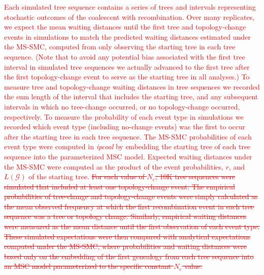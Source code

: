 \documentclass[11pt]{article}
\begin{document}
\textcolor{red}{
Each simulated tree sequence
contains a series of trees and intervals representing stochastic outcomes of
the coalescent with recombination. Over many replicates, we expect the mean
waiting distances until the first tree and topology-change events in simulations 
to match the predicted waiting distances estimated under the MS-SMC, computed
from only observing the starting tree in each tree sequence.
(Note that to avoid any potential bias associated with the first tree interval 
in simulated tree sequences we actually advanced to the first tree after the 
first topology-change event to serve as the starting tree in all analyses.) 
To measure tree and topology-change waiting distances in tree sequences we 
recorded the sum length of the interval that includes the starting tree, and any 
subsequent intervals in which no tree-change occurred, or no topology-change 
occurred, respectively. To measure the probability of each event type in simulations
we recorded which event type (including no-change events) was the first to occur 
after the starting tree in each tree sequence. 
The MS-SMC probabilities of each event type were computed in \emph{ipcoal} by 
embedding the starting tree of each tree sequence into the parameterized MSC model.
Expected waiting distances under the MS-SMC were computed as the product of 
the event probabilities, $r$, and $L(\mathcal{G})$ of the starting tree.
}
\textcolor{red}{\sout{For each value of $N_e$, 10K tree sequences were simulated that
included at least one topology-change event.
The empirical probabilities of tree-change and topology-change events were simply 
calculated as the mean observed frequency at which the first recombination event 
in each tree sequence was a tree or topology change. 
Similarly, empirical waiting 
distances were measured as the mean distance until the first observation of 
each event type. These simulated expectations were then compared with analytical
expectations computed under the MS-SMC, where probabilities and waiting distances 
were based only on the embedding of the first genealogy from each tree sequence 
into an MSC model parameterized to the specific constant $N_e$ value. 
}}


\end{document}
